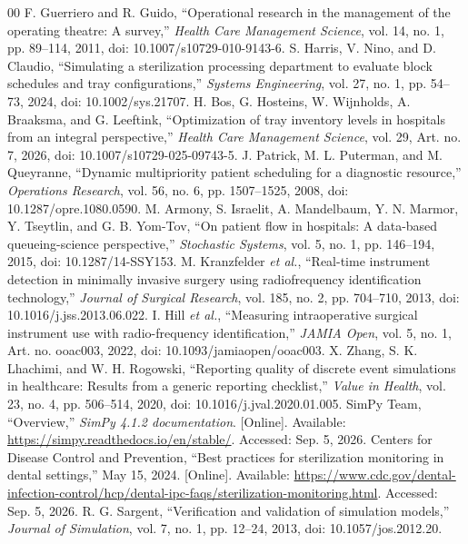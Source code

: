 \documentclass[conference]{IEEEtran}
\begin{document}
\begin{thebibliography}{00}
 F. Guerriero and R. Guido, ``Operational research in the management of the operating theatre: A survey,'' \textit{Health Care Management Science}, vol. 14, no. 1, pp. 89--114, 2011, doi: 10.1007/s10729-010-9143-6.
 S. Harris, V. Nino, and D. Claudio, ``Simulating a sterilization processing department to evaluate block schedules and tray configurations,'' \textit{Systems Engineering}, vol. 27, no. 1, pp. 54--73, 2024, doi: 10.1002/sys.21707.
 H. Bos, G. Hosteins, W. Wijnholds, A. Braaksma, and G. Leeftink, ``Optimization of tray inventory levels in hospitals from an integral perspective,'' \textit{Health Care Management Science}, vol. 29, Art. no. 7, 2026, doi: 10.1007/s10729-025-09743-5.
 J. Patrick, M. L. Puterman, and M. Queyranne, ``Dynamic multipriority patient scheduling for a diagnostic resource,'' \textit{Operations Research}, vol. 56, no. 6, pp. 1507--1525, 2008, doi: 10.1287/opre.1080.0590.
 M. Armony, S. Israelit, A. Mandelbaum, Y. N. Marmor, Y. Tseytlin, and G. B. Yom-Tov, ``On patient flow in hospitals: A data-based queueing-science perspective,'' \textit{Stochastic Systems}, vol. 5, no. 1, pp. 146--194, 2015, doi: 10.1287/14-SSY153.
 M. Kranzfelder \textit{et al.}, ``Real-time instrument detection in minimally invasive surgery using radiofrequency identification technology,'' \textit{Journal of Surgical Research}, vol. 185, no. 2, pp. 704--710, 2013, doi: 10.1016/j.jss.2013.06.022.
 I. Hill \textit{et al.}, ``Measuring intraoperative surgical instrument use with radio-frequency identification,'' \textit{JAMIA Open}, vol. 5, no. 1, Art. no. ooac003, 2022, doi: 10.1093/jamiaopen/ooac003.
 X. Zhang, S. K. Lhachimi, and W. H. Rogowski, ``Reporting quality of discrete event simulations in healthcare: Results from a generic reporting checklist,'' \textit{Value in Health}, vol. 23, no. 4, pp. 506--514, 2020, doi: 10.1016/j.jval.2020.01.005.
 SimPy Team, ``Overview,'' \textit{SimPy 4.1.2 documentation}. [Online]. Available: \url{https://simpy.readthedocs.io/en/stable/}. Accessed: Sep. 5, 2026.
 Centers for Disease Control and Prevention, ``Best practices for sterilization monitoring in dental settings,'' May 15, 2024. [Online]. Available: \url{https://www.cdc.gov/dental-infection-control/hcp/dental-ipc-faqs/sterilization-monitoring.html}. Accessed: Sep. 5, 2026.
 R. G. Sargent, ``Verification and validation of simulation models,'' \textit{Journal of Simulation}, vol. 7, no. 1, pp. 12--24, 2013, doi: 10.1057/jos.2012.20.
\end{thebibliography}
\end{document}
